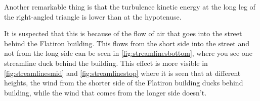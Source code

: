 Another remarkable thing is that the turbulence kinetic energy at the long leg of the right-angled triangle is lower than at the hypotenuse. 

It is suspected that this is because of the flow of air that goes into the street behind the Flatiron building. This flows from the short side into the street and not from the long side can be seen in \autoref{fig:streamlinesbottom}, where you see one streamline duck behind the building. This effect is more visible in \autoref{fig:streamlinesmid} and \autoref{fig:streamlinestop} where it is seen that at different heights, the wind from the shorter side of the Flatiron building ducks behind building, while the wind that comes from the longer side doesn't. 